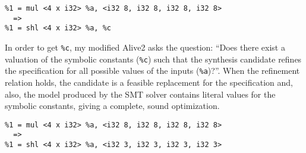 {\begin{quoting}
\begin{Verbatim}
%1 = mul <4 x i32> %a, <i32 8, i32 8, i32 8, i32 8>
  =>
%1 = shl <4 x i32> %a, %c
\end{Verbatim}
\end{quoting}}


In order to get \texttt{\%c}, my modified Alive2 asks the question: ``Does
there exist a valuation of the symbolic constants (\texttt{\%c}) such
that the synthesis candidate refines the specification for all
possible values of the inputs (\texttt{\%a})?''.
%
When the refinement relation holds, the candidate is a feasible
replacement for the specification and, also, the model produced by the
SMT solver contains literal values for the symbolic constants, giving
a complete, sound optimization.

{\begin{quoting}
\begin{Verbatim}
%1 = mul <4 x i32> %a, <i32 8, i32 8, i32 8, i32 8>
  =>
%1 = shl <4 x i32> %a, <i32 3, i32 3, i32 3, i32 3>
\end{Verbatim}
\end{quoting}}